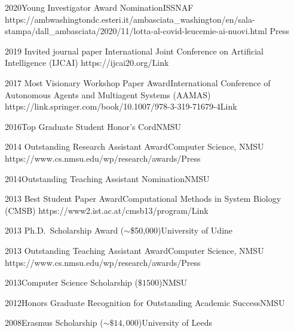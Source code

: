 \begin{awards}
\awardentry
	{2020}{Young Investigator Award Nomination}{ISSNAF}
	{https://ambwashingtondc.esteri.it/ambasciata\_washington/en/sala-stampa/dall\_ambasciata/2020/11/lotta-al-covid-leucemie-ai-nuovi.html}
	{Press}

	\awardentry
	{2019}
	{Invited journal paper}%
	{International Joint Conference on Artificial Intelligence (IJCAI)}
	{https://ijcai20.org/}{Link}

	\awardentry
	{2017}
	{Most Visionary Workshop Paper Award}{International Conference of
	Autonomous Agents and Multiagent Systems (AAMAS)}
   {https://link.springer.com/book/10.1007/978-3-319-71679-4}{Link}

\awardentryN
{2016}{Top Graduate Student Honor's Cord}{NMSU}

\awardentry
	{2014}
	{Outstanding Research Assistant Award}{Computer Science, NMSU}
	{https://www.cs.nmsu.edu/wp/research/awards/}{Press}

\awardentryN
	{2014}{Outstanding Teaching Assistant Nomination}{NMSU}

	\awardentry
	{2013}
	{Best Student Paper Award}{Computational Methods in System Biology (CMSB)}
	{https://www2.ist.ac.at/cmsb13/program/}{Link}

\awardentryN
	{2013}
	{Ph.D.~Scholarship Award ($\sim$\$50,000)}{University of Udine}

\awardentry
   {2013}
   {Outstanding Teaching Assistant Award}{Computer Science, NMSU}
   {https://www.cs.nmsu.edu/wp/research/awards/}{Press}

\awardentryN
{2013}{Computer Science Scholarship ($\$ 1500$)}{NMSU}

\awardentryN
{2012}{Honors Graduate Recognition for Outstanding Academic Success}{NMSU}

\awardentryN
{2008}{Erasmus Scholarship ($\sim \$ 14,000$)}{University of Leeds}

\end{awards}

